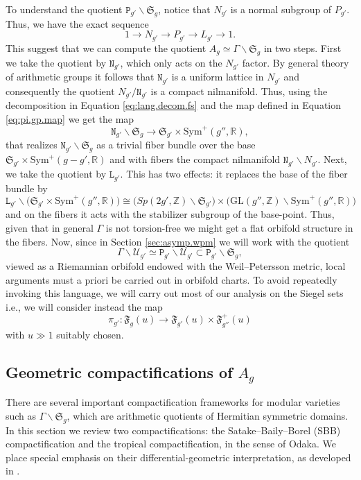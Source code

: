 \documentclass[11pt]{amsart}
\theoremstyle{plain}
\theoremstyle{definition}
\theoremstyle{remark}
\newcommand{\R}{\mathbb R}
\newcommand{\Z}{\mathbb{Z}}
\newcommand{\fS}{\mathfrak{S}}
\newcommand{\sym}{\mathrm{Sym}^{\!+}}
\newcommand{\tP}{\mathtt{P}}
\newcommand{\tN}{\mathtt{N}}
\newcommand{\tL}{\mathtt{L}}
\newcommand{\fF}{\mathfrak{F}}
\begin{document}
To understand the quotient $\tP_{g'}\backslash \fS_g$, notice that $N_{g'}$ is a normal subgroup of $P_{g'}$. Thus, we have the exact sequence 
\begin{equation}\label{UPquot}
    1\to N_{g'}\to P_{g'}\to L_{g'}\to 1.
\end{equation}
This suggest that we can compute the quotient $A_{g}\simeq \Gamma\backslash\fS_g$ in two steps. First we take the quotient by $\mathtt{N}_{g'}$, which only acts on the $N_{g'}$ factor. By general theory of arithmetic groups \cite{BHC62} it follows that $\mathtt{N}_{g'}$ is a uniform lattice in $N_{g'}$ and consequently the quotient $N_{g'}/\mathtt{N}_{g'}$ is a compact nilmanifold. Thus, using the decomposition in Equation \eqref{eq:lang.decom.fs} and the map defined in Equation \eqref{eq:pi.gp.map} we get the map
\[
\tN_{g'}\backslash\fS_g\longrightarrow \fS_{g'}\times \sym(g'',\R),
\]
that realizes $\tN_{g'}\backslash\fS_g$ as a trivial fiber bundle over the base $\fS_{g'}\times\sym(g-g',\R)$ and with fibers the compact nilmanifold $\tN_{g'}\backslash N_{g'}$. Next, we take the quotient by $\tL_{g'}$. This has two effects: it replaces the base of the fiber bundle by
\[
\tL_{g'}\backslash\big(\fS_{g'}\!\times\!\sym(g'',\R)\big)\cong \big(Sp(2g',\Z)\backslash\fS_{g'}\big)\!\times\!\big( \mathrm{GL}(g'',\Z)\backslash \sym(g'',\R)\big)
\]
and on the fibers it acts with the stabilizer subgroup of the base-point. Thus, given that in general $\Gamma$ is not torsion-free we might get a flat orbifold structure in the fibers. Now, since in Section \ref{sec:asymp.wpm} we will work with the quotient
\[
\Gamma\backslash\mathcal{U}_{g'}\simeq\tP_{g'}\backslash\mathcal{U}_{g'}\subset\tP_{g'}\backslash\fS_g,
\]
viewed as a Riemannian orbifold endowed with the Weil--Petersson metric, local arguments must a priori be carried out in orbifold charts. To avoid repeatedly invoking this language, we will carry out most of our analysis on the Siegel sets i.e., we will consider instead the map 
\begin{equation}
    \pi_{g'}:\fF_{g}(u)\longrightarrow \fF_{g'}(u)\times\fF_{g''}^+(u)
\end{equation}
with $u\gg 1$ suitably chosen. 

\subsection{Geometric compactifications of \texorpdfstring{$A_g$}.}
\label{sect:geom.comp.Ag}
There are several important compactification frameworks for modular varieties such as $\Gamma\backslash \fS_g$, which are arithmetic quotients of Hermitian symmetric domains. In this section we review two compactifications: the Satake--Baily--Borel (SBB) compactification and the tropical compactification, in the sense of Odaka. We place special emphasis on their differential-geometric interpretation, as developed in \cite{Odaka2019}.
\end{document}
